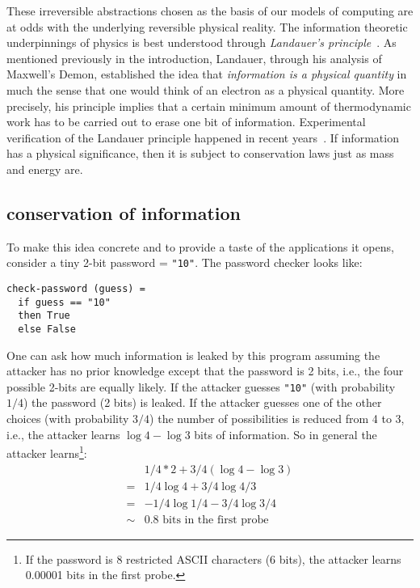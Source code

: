 \documentclass{article}
\begin{document}
These irreversible abstractions chosen as the basis of our
models of computing are at odds with the underlying
reversible physical reality. The information theoretic underpinnings
of physics is best understood through \emph{Landauer's
principle}~\cite{Landauer:1961}. As mentioned previously in the
introduction, Landauer, through his analysis of
Maxwell's Demon, established the idea that \emph{information is a
physical quantity} in much the sense that one would think of an
electron as a physical quantity. More precisely, his principle implies
that a certain minimum amount of
thermodynamic work has to be carried out to erase one bit of
information. Experimental verification of the Landauer principle
happened in recent years~\cite{berut2012experimental}. If information
has a physical significance, then it is subject to conservation laws
just as mass and energy are.

\subsection{conservation of information}

To make this idea concrete and to provide a taste of the applications
it opens, consider a tiny 2-bit password = \verb|"10"|. The password
checker looks like:

\begin{verbatim}
check-password (guess) =
  if guess == "10"
  then True
  else False
\end{verbatim}

One can ask how much information is leaked by this program assuming
the attacker has no prior knowledge except that the password is 2
bits, i.e., the four possible 2-bits are equally likely. If the
attacker guesses \verb|"10"| (with probability $1/4$) the password (2
bits) is leaked. If the attacker guesses one of the other choices
(with probability $3/4$) the number of possibilities is reduced from 4
to 3, i.e., the attacker learns $\log{4} - \log{3}$ bits of
information. So in general the attacker learns\footnote{If the
  password is 8 restricted ASCII characters (6 bits), the attacker
  learns 0.00001 bits in the first probe.}:
\[\begin{array}{ll}
   &  1/4 * 2 + 3/4 (\log{4} - \log{3}) \\
  =&  1/4 \log{4} + 3/4 \log{4/3} \\
  =&  - 1/4 \log{1/4} - 3/4 \log{3/4} \\
  \sim& 0.8 \mbox{~bits~in~the~first~probe}
\end{array}\]
\end{document}
